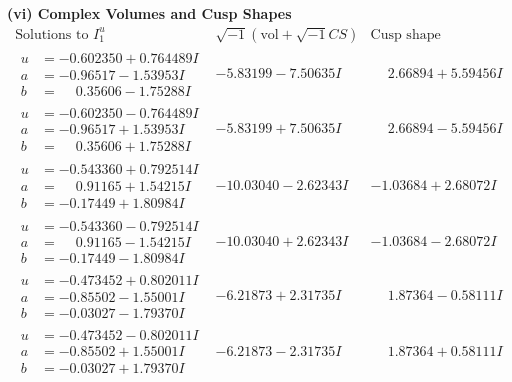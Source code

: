 \documentclass[1p]{elsarticle_modified}
\theoremstyle{definition}
\newcommand{\I}{\sqrt{-1}}
\begin{document}
\newpage\flushleft \textbf{(vi) Complex Volumes and Cusp Shapes}
$$\begin{array}{c|c|c}  
\text{Solutions to }I^u_{1}& \I (\text{vol} + \sqrt{-1}CS) & \text{Cusp shape}\\
 \hline 
\begin{aligned}
u &= -0.602350 + 0.764489 I \\
a &= -0.96517 - 1.53953 I \\
b &= \phantom{-}0.35606 - 1.75288 I\end{aligned}
 & -5.83199 - 7.50635 I & \phantom{-}2.66894 + 5.59456 I \\ \hline\begin{aligned}
u &= -0.602350 - 0.764489 I \\
a &= -0.96517 + 1.53953 I \\
b &= \phantom{-}0.35606 + 1.75288 I\end{aligned}
 & -5.83199 + 7.50635 I & \phantom{-}2.66894 - 5.59456 I \\ \hline\begin{aligned}
u &= -0.543360 + 0.792514 I \\
a &= \phantom{-}0.91165 + 1.54215 I \\
b &= -0.17449 + 1.80984 I\end{aligned}
 & -10.03040 - 2.62343 I & -1.03684 + 2.68072 I \\ \hline\begin{aligned}
u &= -0.543360 - 0.792514 I \\
a &= \phantom{-}0.91165 - 1.54215 I \\
b &= -0.17449 - 1.80984 I\end{aligned}
 & -10.03040 + 2.62343 I & -1.03684 - 2.68072 I \\ \hline\begin{aligned}
u &= -0.473452 + 0.802011 I \\
a &= -0.85502 - 1.55001 I \\
b &= -0.03027 - 1.79370 I\end{aligned}
 & -6.21873 + 2.31735 I & \phantom{-}1.87364 - 0.58111 I \\ \hline\begin{aligned}
u &= -0.473452 - 0.802011 I \\
a &= -0.85502 + 1.55001 I \\
b &= -0.03027 + 1.79370 I\end{aligned}
 & -6.21873 - 2.31735 I & \phantom{-}1.87364 + 0.58111 I \\ \hline\begin{aligned}

\end{aligned}
\end{array}$$
\end{document}

